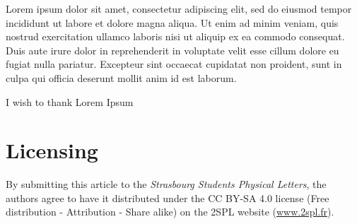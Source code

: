 \documentclass[
 reprint,
 preprintnumbers,
 nobibnotes,
 nofootinbib,
 longbibliography,
 amsmath,amssymb,
 aps,pra,
 onecolumn
]{revtex4-2}
\begin{document}
Lorem ipsum dolor sit amet, consectetur adipiscing elit, sed do eiusmod tempor incididunt ut labore et dolore magna aliqua. Ut enim ad minim veniam, quis nostrud exercitation ullamco laboris nisi ut aliquip ex ea commodo consequat. Duis aute irure dolor in reprehenderit in voluptate velit esse cillum dolore eu fugiat nulla pariatur. Excepteur sint occaecat cupidatat non proident, sunt in culpa qui officia deserunt mollit anim id est laborum.


\begin{acknowledgments}
    I wish to thank Lorem Ipsum
\end{acknowledgments}


\section*{Licensing}

By submitting this article to the {\em Strasbourg Students Physical Letters}, the authors agree to have it distributed under the CC BY-SA 4.0 license (Free distribution - Attribution - Share alike) on the 2SPL website (\url{www.2spl.fr}).


\nocite{*}
\end{document}
